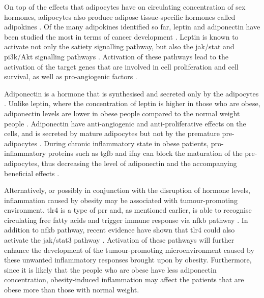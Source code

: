 On top of the effects that \glspl{adipocyte} have on circulating concentration of sex hormones, \glspl{adipocyte} also produce adipose tissue-specific hormones called adipokines \citep{Roberts2010}.
Of the many adipokines identified so far, leptin and adipo\-nectin have been studied the most in terms of cancer development \citep{Renehan2006,Roberts2010}.
Leptin is known to activate not only the satiety signalling pathway, but also the \gls{jak}/\gls{stat} and \gls{pi3k}/Akt signalling pathways \citep{Garofalo2006,Renehan2006}.
Activation of these pathways lead to the activation of the target genes that are involved in cell proliferation and cell survival, as well as pro-angiogenic factors \citep{Garofalo2006}.

Adiponectin is a hormone that is synthesised and secreted only by the \glspl{adipocyte} \citep{Kelesidis2006}.
Unlike leptin, where the concentration of leptin is higher in those who are obese, adiponectin levels are lower in obese people compared to the normal weight people \citep{Kelesidis2006,Renehan2006}.
Adiponectin have anti-angiogenic and anti-proliferative effects on the cells, and is secreted by mature adipocytes but not by the premature pre-adipocytes \citep{Gilbert2013}.
During chronic inflammatory state in obese patients, pro-inflammatory proteins such as \gls{tgfb} and \gls{ifny} can block the maturation of the pre-adipocytes, thus decreasing the level of adiponectin and the accompanying beneficial effects \citep{Gilbert2013}.

Alternatively, or possibly in conjunction with the disruption of hormone levels, inflammation caused by obesity may be associated with tumour-promoting environment.
\Gls{tlr}4 is a type of \gls{prr} and, as mentioned earlier, is able to recognise circulating free fatty acids and trigger immune response via \gls{nfkb} pathway \citep{Lumeng2011}.
In addition to \gls{nfkb} pathway, recent evidence have shown that \gls{tlr}4 could also activate the \gls{jak}/\gls{stat3} pathway \citep{Yu2014}.
Activation of these pathways will further enhance the development of the tumour-promoting microenvironment caused by these unwanted inflammatory responses brought upon by obesity.
Furthermore, since it is likely that the people who are obese have less adiponectin concentration, obesity-induced inflammation may affect the patients that are obese more than those with normal weight.

